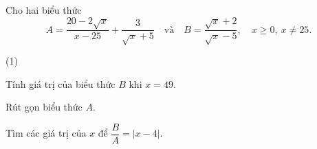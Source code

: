 
\begin{bt}
Cho hai biểu thức
\[
A=\dfrac{20-2\sqrt{x}}{x-25}+\dfrac{3}{\sqrt{x}+5}
\quad\text{và}\quad
B=\dfrac{\sqrt{x}+2}{\sqrt{x}-5},\quad x\ge 0,\ x\ne 25.
\]
\begin{cacy}(1)
\item Tính giá trị của biểu thức $B$ khi $x=49$.
\item Rút gọn biểu thức $A$.
\item Tìm các giá trị của $x$ để $\dfrac{B}{A}=|x-4|$.
\end{cacy}
\end{bt}
